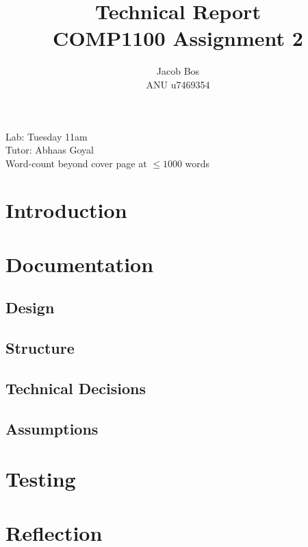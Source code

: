 \documentclass[11pt]{article}
\title{Technical Report\\ COMP1100 Assignment 2}
\author{Jacob Bos\\ ANU u7469354}
\begin{document}
\maketitle
{}
\begin{center}
  Lab: Tuesday 11am\\
  Tutor: Abhaas Goyal\\
  Word-count beyond cover page at $\leq 1000$ words
\end{center}
\tableofcontents
\newpage
{}
\section*{Introduction} 



\section{Documentation}%
\subsection{Design}


\subsection{Structure}


\subsection{Technical Decisions}


 \subsection{Assumptions}%



\section{Testing}%

\section{Reflection}




\end{document}
